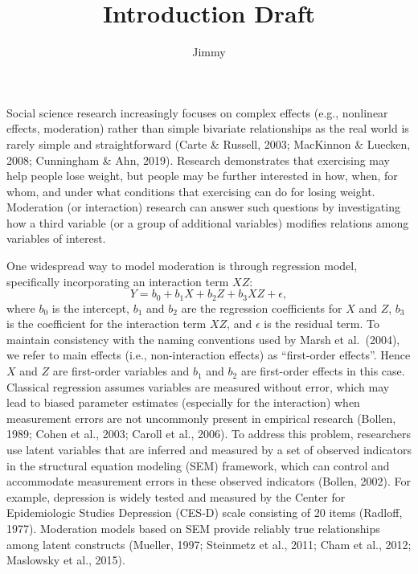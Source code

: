 \documentclass[
  man]{apa7}
\title{Introduction Draft}
\author{Jimmy\textsuperscript{}}
\date{}
\affiliation{\phantom{0}}
\begin{document}
\maketitle

Social science research increasingly focuses on complex effects (e.g., nonlinear effects, moderation) rather than simple bivariate relationships as the real world is rarely simple and straightforward (Carte \& Russell, 2003; MacKinnon \& Luecken, 2008; Cunningham \& Ahn, 2019). Research demonstrates that exercising may help people lose weight, but people may be further interested in how, when, for whom, and under what conditions that exercising can do for losing weight. Moderation (or interaction) research can answer such questions by investigating how a third variable (or a group of additional variables) modifies relations among variables of interest.

One widespread way to model moderation is through regression model, specifically incorporating an interaction term \(XZ\):
\begin{equation}
Y = b_{0} + b_{1}X + b_{2}Z + b_{3}XZ + \epsilon,
\end{equation}
where \(b_{0}\) is the intercept, \(b_{1}\) and \(b_{2}\) are the regression coefficients for \(X\) and \(Z\), \(b_{3}\) is the coefficient for the interaction term \(XZ\), and \(\epsilon\) is the residual term. To maintain consistency with the naming conventions used by Marsh et al.~(2004), we refer to main effects (i.e., non-interaction effects) as ``first-order effects''. Hence \(X\) and \(Z\) are first-order variables and \(b_{1}\) and \(b_{2}\) are first-order effects in this case. Classical regression assumes variables are measured without error, which may lead to biased parameter estimates (especially for the interaction) when measurement errors are not uncommonly present in empirical research (Bollen, 1989; Cohen et al., 2003; Caroll et al., 2006). To address this problem, researchers use latent variables that are inferred and measured by a set of observed indicators in the structural equation modeling (SEM) framework, which can control and accommodate measurement errors in these observed indicators (Bollen, 2002). For example, depression is widely tested and measured by the Center for Epidemiologic Studies Depression (CES-D) scale consisting of 20 items (Radloff, 1977). Moderation models based on SEM provide reliably true relationships among latent constructs (Mueller, 1997; Steinmetz et al., 2011; Cham et al., 2012; Maslowsky et al., 2015).
\end{document}

